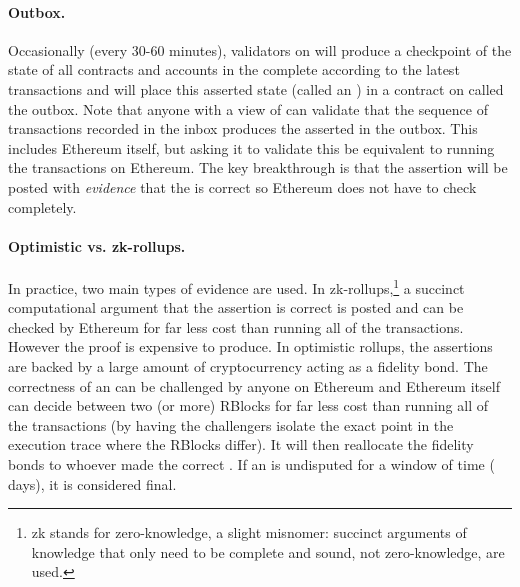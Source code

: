 \paragraph{Outbox.} Occasionally (\eg every 30-60 minutes), validators on \layertwo will produce a checkpoint of the state of all contracts and accounts in the complete \layertwo according to the latest transactions and will place this asserted state (called an \rblock) in a contract on \layerone called the outbox. Note that anyone with a view of \layerone can validate that the sequence of transactions recorded in the inbox produces the asserted \rblock in the outbox. This includes Ethereum itself, but asking it to validate this be equivalent to running the transactions on Ethereum. The key breakthrough is that the assertion will be posted with \textit{evidence} that the \rblock is correct so Ethereum does not have to check completely.

\paragraph{Optimistic vs. zk-rollups.} In practice, two main types of evidence are used. In zk-rollups,\footnote{zk stands for zero-knowledge, a slight misnomer: succinct arguments of knowledge that only need to be complete and sound, not zero-knowledge, are used.} a succinct computational argument that the assertion is correct is posted and can be checked by Ethereum for far less cost than running all of the transactions. However the proof is expensive to produce. In optimistic rollups, the assertions are backed by a large amount of cryptocurrency acting as a fidelity bond. The correctness of an \rblock can be challenged by anyone on Ethereum and Ethereum itself can decide between two (or more) \textsf{RBlocks} for far less cost than running all of the transactions (by having the challengers isolate the exact point in the execution trace where the \textsf{RBlocks} differ). It will then reallocate the fidelity bonds to whoever made the correct \rblock. If an \rblock is undisputed for a window of time ( days), it is considered final.

